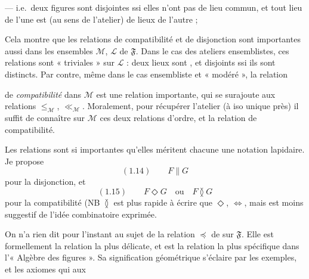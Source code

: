 \documentclass[11pt,a4paper]{article}
\begin{document}
— i.e.\ deux figures sont disjointes ssi elles n'ont pas de lieu commun, et tout lieu de l'une est   (au sens de  l'atelier) de  lieux de l'autre ;

Cela montre que les relations de compatibilité et de disjonction sont importantes aussi dans les \struck{\ill{}} ensembles $\mathcal{M}$, $\mathcal{L}$ de $\mathfrak{F}$. Dans le cas des ateliers ensemblistes, ces relations sont « triviales » sur $\mathcal{L}$ : deux lieux sont  , et disjoints ssi ils sont distincts. Par contre, même dans le cas ensembliste et « modéré », la relation

de \emph{compatibilité} dans $\mathcal{M}$ est une  relation importante, qui se surajoute aux relations $\leq_{\mathcal{M}}$, $\ll_{\mathcal{M}}$. Moralement, pour récupérer l'atelier (à iso unique près) il suffit de connaître sur $\mathcal{M}$ ces deux relations d'ordre, et la relation de compatibilité.

Les relations  \struck{\ill{}} sont si importantes qu'elles méritent chacune une notation lapidaire. Je propose \struck{\ill{}}
\[
  (1.14) \qquad F \parallel G
\]
pour la disjonction, et \struck{\ill{}}
\[
  (1.15) \qquad F \mathbin{\Diamond} G \quad \text{ou} \quad F \mathbin{\between} G
\]
pour la compatibilité (NB $\between$ est plus rapide à écrire que $\Diamond$, $\Leftrightarrow$, mais est moins suggestif de l'idée combinatoire exprimée.

On n'a rien dit pour l'instant au sujet de la relation \struck{$\ll$} $\preccurlyeq$ de  sur $\mathfrak{F}$. Elle est formellement la relation la plus délicate, et est la relation la plus spécifique dans l'« Algèbre des figures ». Sa signification géométrique s'éclaire par les exemples, et les axiomes qui aux
\end{document}

